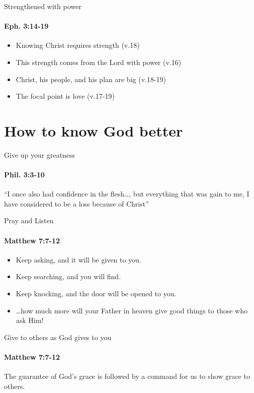 \begin{frame}{Strengthened with power}
\framesubtitle{Eph. 3:14-19}

\begin{itemize}
	\item Knowing Christ requires strength (v.18)
	\item This strength comes from the Lord with power (v.16)
	\item Christ, his people, and his plan are big (v.18-19)
	\item The focal point is love (v.17-19)
\end{itemize}

\end{frame}

\section{How to know God better}

\begin{frame}{Give up your greatness}
\framesubtitle{Phil. 3:3-10}

``I once also had confidence in the flesh\ldots, but everything that was gain to me, I have considered to be a loss because of Christ''

\end{frame}

\begin{frame}{Pray and Listen}
\framesubtitle{Matthew 7:7-12}

\begin{itemize}
\item Keep asking, and it will be given to you. 
\item Keep searching, and you will find. 
\item Keep knocking, and the door will be opened to you. 
\item \ldots how much more will your Father in heaven give good things to those
who ask Him! 
\end{itemize}

\end{frame}

\begin{frame}{Give to others as God gives to you}
\framesubtitle{Matthew 7:7-12}

The guarantee of God's grace is followed by a command for us to show grace to others.

\end{frame}

